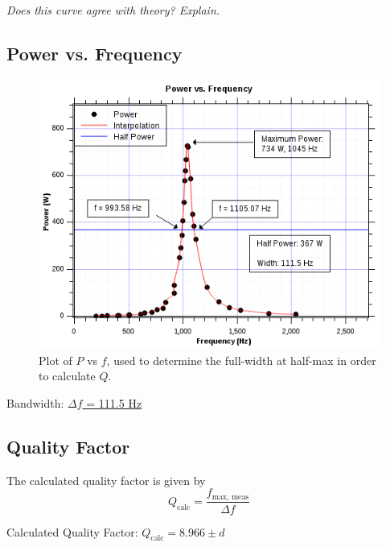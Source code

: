 \documentclass[twocolumn,english]{IEEEtran}
\theoremstyle{plain}
\theoremstyle{plain}
\begin{document}
\textit{Does this curve agree with theory? Explain.}

\hrulefill

\subsection{Power vs. Frequency}

\begin{figure}[h!]
	\begin{centering}
	\begin{center}
	\includegraphics[width=\linewidth]{./Part8.png}
	\caption{Plot of $P$ vs $f$, used to determine the full-width at half-max in order to calculate $Q$.}
	\label{fig:PowervsFreq}
	\end{center}
	\par\end{centering}
\end{figure}

Bandwidth: \hfill\underline{$\Delta f$ = 111.5 Hz}

\hrulefill

\subsection{Quality Factor}
The calculated quality factor is given by
\begin{equation}
	Q_{\text{calc}} = \frac{f_{\text{max, meas}}}{\Delta f}
\end{equation}

Calculated Quality Factor: \underline{$Q_{\text{calc}} = 8.966\pm d$}
\end{document}
